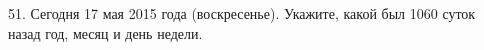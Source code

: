 51. Сегодня 17 мая 2015 года (воскресенье). Укажите, какой был 1060 суток назад год, месяц и день недели.\\
